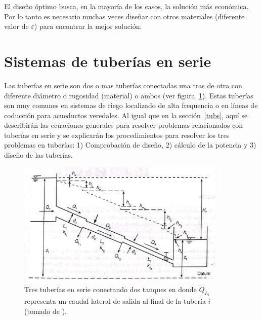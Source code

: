 \documentclass[10pt, oneside]{article}
\begin{document}
El dise\~no \'optimo busca, en la mayor\'ia de los casos, la soluci\'on m\'as econ\'omica. Por lo tanto es necesario muchas veces dise\~nar con otros materiales (diferente valor de $\varepsilon$) para encontrar  la mejor soluci\'on.
 

\section{Sistemas de tuber\'ias en serie} 
Las tuber\'ias en serie son dos o mas tuber\'ias conectadas una tras de otra con diferente di\'ametro o rugosidad (material) o ambos (ver figura~\ref{ttuse}). Estas tuber\'ias son muy comunes en sistemas de riego localizado de alta frequencia o en l\'ineas de coducci\'on para acueductos veredales. Al igual que en la secci\'on~\ref{tubs}, aqu\'i se describir\'an las ecuaciones generales para resolver problemas relacionados con tuber\'ias en serie y se explicar\'an los procedimientos para resolver los tres problemas en tuber\'ias: 1) Comprobaci\'on de dise\~no, 2) c\'alculo de la potencia y 3) dise\~no de las tuber\'ias.

\begin{figure}[h]
\centering
\includegraphics[width=10cm]{./figs/comp2.jpeg}
\caption{Tres tuber\'ias en serie conectando dos tanques en donde $Q_{L_i}$ representa un caudal lateral de salida al final de la tuber\'ia $i$ (tomado de \cite{saldarriaga}).} 
\label{ttuse}
\end{figure}
\end{document}
